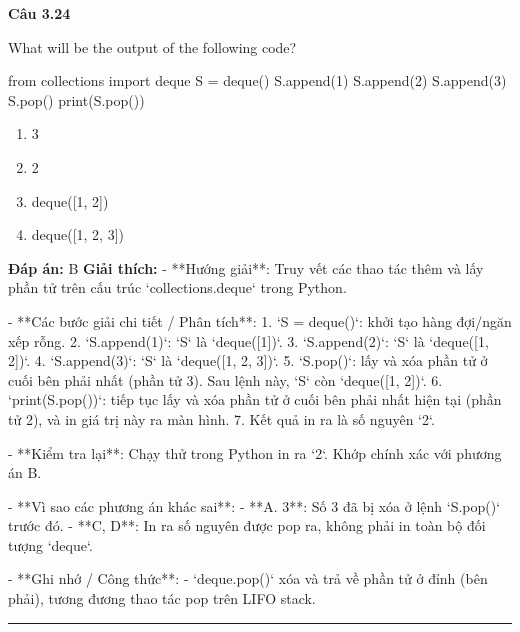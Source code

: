 \documentclass[11pt,a4paper]{article}
\newenvironment{question}[1]{%
  \par\vspace{1em}\noindent\textbf{\large Câu #1}\par\vspace{0.4em}
}{%
  \par\vspace{1em}\hrule\vspace{0.6em}
}
\newenvironment{choices}{%
  \begin{enumerate}[label=\textbf{\Alph*.},leftmargin=2.2em,itemsep=2pt,topsep=3pt]
}{%
  \end{enumerate}
}
\newcommand{\choice}{\item}
\newenvironment{codebox}{%
  \begin{tcolorbox}[colback=gray!8!white,colframe=gray!50!black,arc=1.5mm,boxrule=0.6pt,left=3mm,right=3mm,top=2.5mm,bottom=2.5mm]
  \ttfamily\small
}{%
  \end{tcolorbox}
}
\begin{document}
\begin{question}{3.24}
What will be the output of the following code?
\begin{codebox}
from collections import deque
S = deque()
S.append(1)
S.append(2)
S.append(3)
S.pop()
print(S.pop())
\end{codebox}
\begin{choices}
\choice 3
\choice 2
\choice deque([1, 2])
\choice deque([1, 2, 3])
\end{choices}
\textbf{Đáp án:} B
\textbf{Giải thích:} - **Hướng giải**:
  Truy vết các thao tác thêm và lấy phần tử trên cấu trúc `collections.deque` trong Python.

- **Các bước giải chi tiết / Phân tích**:
  1. `S = deque()`: khởi tạo hàng đợi/ngăn xếp rỗng.
  2. `S.append(1)`: `S` là `deque([1])`.
  3. `S.append(2)`: `S` là `deque([1, 2])`.
  4. `S.append(3)`: `S` là `deque([1, 2, 3])`.
  5. `S.pop()`: lấy và xóa phần tử ở cuối bên phải nhất (phần tử 3). Sau lệnh này, `S` còn `deque([1, 2])`.
  6. `print(S.pop())`: tiếp tục lấy và xóa phần tử ở cuối bên phải nhất hiện tại (phần tử 2), và in giá trị này ra màn hình.
  7. Kết quả in ra là số nguyên `2`.

- **Kiểm tra lại**:
  Chạy thử trong Python in ra `2`.
  Khớp chính xác với phương án B.

- **Vì sao các phương án khác sai**:
  - **A. 3**: Số 3 đã bị xóa ở lệnh `S.pop()` trước đó.
  - **C, D**: In ra số nguyên được pop ra, không phải in toàn bộ đối tượng `deque`.

- **Ghi nhớ / Công thức**:
  - `deque.pop()` xóa và trả về phần tử ở đỉnh (bên phải), tương đương thao tác pop trên LIFO stack.
\end{question}
\end{document}

